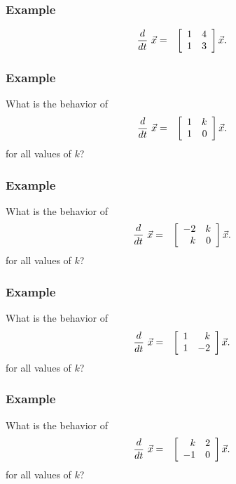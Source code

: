 \begin{frame}
  \frametitle{Example}

  \begin{eqnarray*}
    \deriv{~}{t} \vec{x} & = & \arrayTwo{1}{4}{1}{3} \vec{x}.
  \end{eqnarray*}

\end{frame}


\begin{frame}
  \frametitle{Example}

  What is the behavior of
  \begin{eqnarray*}
    \deriv{~}{t} \vec{x} & = & \arrayTwo{1}{k}{1}{0} \vec{x}.
  \end{eqnarray*}
  for all values of $k$?
  

\end{frame}


\begin{frame}
  \frametitle{Example}

  What is the behavior of
  \begin{eqnarray*}
    \deriv{~}{t} \vec{x} & = & \arrayTwo{-2}{k}{k}{0} \vec{x}.
  \end{eqnarray*}
  for all values of $k$?


\end{frame}


\begin{frame}
  \frametitle{Example}

  What is the behavior of
  \begin{eqnarray*}
    \deriv{~}{t} \vec{x} & = & \arrayTwo{1}{k}{1}{-2} \vec{x}.
  \end{eqnarray*}
  for all values of $k$?


\end{frame}


\begin{frame}
  \frametitle{Example}

  What is the behavior of
  \begin{eqnarray*}
    \deriv{~}{t} \vec{x} & = & \arrayTwo{k}{2}{-1}{0} \vec{x}.
  \end{eqnarray*}
  for all values of $k$?


\end{frame}





